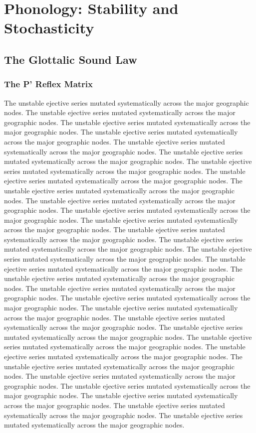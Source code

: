 \chapter{Phonology: Stability and Stochasticity}
\section{The Glottalic Sound Law}
\subsection{The P' Reflex Matrix}
The unstable ejective series mutated systematically across the major geographic nodes. The unstable ejective series mutated systematically across the major geographic nodes. The unstable ejective series mutated systematically across the major geographic nodes. The unstable ejective series mutated systematically across the major geographic nodes. The unstable ejective series mutated systematically across the major geographic nodes. The unstable ejective series mutated systematically across the major geographic nodes. The unstable ejective series mutated systematically across the major geographic nodes. The unstable ejective series mutated systematically across the major geographic nodes. The unstable ejective series mutated systematically across the major geographic nodes. The unstable ejective series mutated systematically across the major geographic nodes. The unstable ejective series mutated systematically across the major geographic nodes. The unstable ejective series mutated systematically across the major geographic nodes. The unstable ejective series mutated systematically across the major geographic nodes. The unstable ejective series mutated systematically across the major geographic nodes. The unstable ejective series mutated systematically across the major geographic nodes. The unstable ejective series mutated systematically across the major geographic nodes. The unstable ejective series mutated systematically across the major geographic nodes. The unstable ejective series mutated systematically across the major geographic nodes. The unstable ejective series mutated systematically across the major geographic nodes. The unstable ejective series mutated systematically across the major geographic nodes. The unstable ejective series mutated systematically across the major geographic nodes. The unstable ejective series mutated systematically across the major geographic nodes. The unstable ejective series mutated systematically across the major geographic nodes. The unstable ejective series mutated systematically across the major geographic nodes. The unstable ejective series mutated systematically across the major geographic nodes. The unstable ejective series mutated systematically across the major geographic nodes. The unstable ejective series mutated systematically across the major geographic nodes. The unstable ejective series mutated systematically across the major geographic nodes. The unstable ejective series mutated systematically across the major geographic nodes. The unstable ejective series mutated systematically across the major geographic nodes. 

